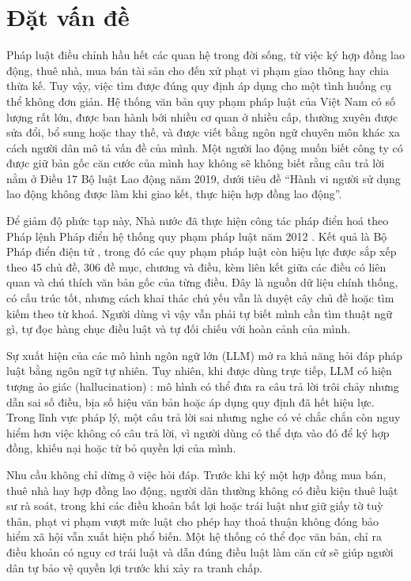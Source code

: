 \documentclass[../DoAn.tex]{subfiles}
\begin{document}
\section{Đặt vấn đề}
\label{section:1.1}
Pháp luật điều chỉnh hầu hết các quan hệ trong đời sống, từ việc ký hợp đồng lao động, thuê nhà, mua bán tài sản cho đến xử phạt vi phạm giao thông hay chia thừa kế. Tuy vậy, việc tìm được đúng quy định áp dụng cho một tình huống cụ thể không đơn giản. Hệ thống văn bản quy phạm pháp luật của Việt Nam có số lượng rất lớn, được ban hành bởi nhiều cơ quan ở nhiều cấp, thường xuyên được sửa đổi, bổ sung hoặc thay thế, và được viết bằng ngôn ngữ chuyên môn khác xa cách người dân mô tả vấn đề của mình. Một người lao động muốn biết công ty có được giữ bản gốc căn cước của mình hay không sẽ không biết rằng câu trả lời nằm ở Điều 17 Bộ luật Lao động năm 2019, dưới tiêu đề ``Hành vi người sử dụng lao động không được làm khi giao kết, thực hiện hợp đồng lao động''.

Để giảm độ phức tạp này, Nhà nước đã thực hiện công tác pháp điển hoá theo Pháp lệnh Pháp điển hệ thống quy phạm pháp luật năm 2012 \cite{plpd2012}. Kết quả là Bộ Pháp điển điện tử \cite{phapdienportal}, trong đó các quy phạm pháp luật còn hiệu lực được sắp xếp theo 45 chủ đề, 306 đề mục, chương và điều, kèm liên kết giữa các điều có liên quan và chú thích văn bản gốc của từng điều. Đây là nguồn dữ liệu chính thống, có cấu trúc tốt, nhưng cách khai thác chủ yếu vẫn là duyệt cây chủ đề hoặc tìm kiếm theo từ khoá. Người dùng vì vậy vẫn phải tự biết mình cần tìm thuật ngữ gì, tự đọc hàng chục điều luật và tự đối chiếu với hoàn cảnh của mình.

Sự xuất hiện của các mô hình ngôn ngữ lớn (LLM) \cite{brown2020gpt3} mở ra khả năng hỏi đáp pháp luật bằng ngôn ngữ tự nhiên. Tuy nhiên, khi được dùng trực tiếp, LLM có hiện tượng ảo giác (hallucination) \cite{ji2023hallucination}: mô hình có thể đưa ra câu trả lời trôi chảy nhưng dẫn sai số điều, bịa số hiệu văn bản hoặc áp dụng quy định đã hết hiệu lực. Trong lĩnh vực pháp lý, một câu trả lời sai nhưng nghe có vẻ chắc chắn còn nguy hiểm hơn việc không có câu trả lời, vì người dùng có thể dựa vào đó để ký hợp đồng, khiếu nại hoặc từ bỏ quyền lợi của mình.

Nhu cầu không chỉ dừng ở việc hỏi đáp. Trước khi ký một hợp đồng mua bán, thuê nhà hay hợp đồng lao động, người dân thường không có điều kiện thuê luật sư rà soát, trong khi các điều khoản bất lợi hoặc trái luật như giữ giấy tờ tuỳ thân, phạt vi phạm vượt mức luật cho phép hay thoả thuận không đóng bảo hiểm xã hội vẫn xuất hiện phổ biến. Một hệ thống có thể đọc văn bản, chỉ ra điều khoản có nguy cơ trái luật và dẫn đúng điều luật làm căn cứ sẽ giúp người dân tự bảo vệ quyền lợi trước khi xảy ra tranh chấp.
\end{document}
